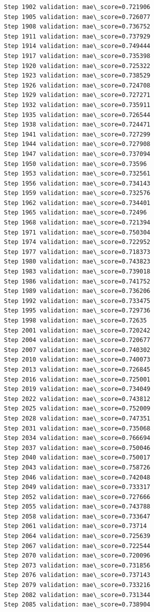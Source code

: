 \documentclass[11pt]{article}
\begin{document}
\begin{Verbatim}[commandchars=\\\{\}]
Step 1902 validation: mae\_score=0.721906
Step 1905 validation: mae\_score=0.726077
Step 1908 validation: mae\_score=0.736752
Step 1911 validation: mae\_score=0.737929
Step 1914 validation: mae\_score=0.749444
Step 1917 validation: mae\_score=0.735398
Step 1920 validation: mae\_score=0.725322
Step 1923 validation: mae\_score=0.738529
Step 1926 validation: mae\_score=0.724708
Step 1929 validation: mae\_score=0.727271
Step 1932 validation: mae\_score=0.735911
Step 1935 validation: mae\_score=0.726544
Step 1938 validation: mae\_score=0.724471
Step 1941 validation: mae\_score=0.727299
Step 1944 validation: mae\_score=0.727908
Step 1947 validation: mae\_score=0.737094
Step 1950 validation: mae\_score=0.73596
Step 1953 validation: mae\_score=0.732561
Step 1956 validation: mae\_score=0.734143
Step 1959 validation: mae\_score=0.732576
Step 1962 validation: mae\_score=0.734401
Step 1965 validation: mae\_score=0.72496
Step 1968 validation: mae\_score=0.721394
Step 1971 validation: mae\_score=0.750304
Step 1974 validation: mae\_score=0.722952
Step 1977 validation: mae\_score=0.718373
Step 1980 validation: mae\_score=0.743823
Step 1983 validation: mae\_score=0.739018
Step 1986 validation: mae\_score=0.741752
Step 1989 validation: mae\_score=0.736206
Step 1992 validation: mae\_score=0.733475
Step 1995 validation: mae\_score=0.729736
Step 1998 validation: mae\_score=0.72635
Step 2001 validation: mae\_score=0.720242
Step 2004 validation: mae\_score=0.720677
Step 2007 validation: mae\_score=0.740302
Step 2010 validation: mae\_score=0.740073
Step 2013 validation: mae\_score=0.726845
Step 2016 validation: mae\_score=0.725001
Step 2019 validation: mae\_score=0.734049
Step 2022 validation: mae\_score=0.743812
Step 2025 validation: mae\_score=0.752009
Step 2028 validation: mae\_score=0.747351
Step 2031 validation: mae\_score=0.735068
Step 2034 validation: mae\_score=0.766694
Step 2037 validation: mae\_score=0.750046
Step 2040 validation: mae\_score=0.750017
Step 2043 validation: mae\_score=0.758726
Step 2046 validation: mae\_score=0.742048
Step 2049 validation: mae\_score=0.733317
Step 2052 validation: mae\_score=0.727666
Step 2055 validation: mae\_score=0.743788
Step 2058 validation: mae\_score=0.733647
Step 2061 validation: mae\_score=0.73714
Step 2064 validation: mae\_score=0.725639
Step 2067 validation: mae\_score=0.722544
Step 2070 validation: mae\_score=0.720096
Step 2073 validation: mae\_score=0.731856
Step 2076 validation: mae\_score=0.737143
Step 2079 validation: mae\_score=0.733216
Step 2082 validation: mae\_score=0.731344
Step 2085 validation: mae\_score=0.738904

\end{Verbatim}
\end{document}
